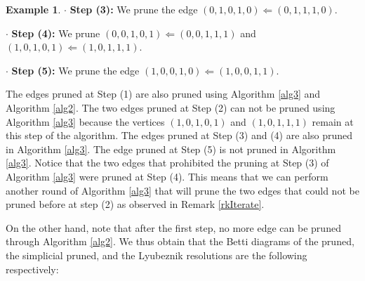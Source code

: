 \documentclass[12pt]{amsart}
\theoremstyle{definition}
\newtheorem{example}[theorem]{Example}
\theoremstyle{remark}
\numberwithin{equation}{section}
\begin{document}
\begin{example}
\noindent $\cdot$ {\bf Step (3):} We prune the edge $(0,1,0,1,0) \Leftarrow (0,1,1,1,0)$.



\noindent $\cdot$ {\bf Step (4):}  We prune  $(0,0,1,0,1) \Leftarrow (0,0,1,1,1)$ and $(1,0,1,0,1) \Leftarrow (1,0,1,1,1)$.

\noindent $\cdot$ {\bf Step (5):} We prune the edge $(1,0,0,1,0) \Leftarrow (1,0,0,1,1)$.

\vskip 2mm



The edges pruned at Step (1) are also pruned using Algorithm \ref{alg3} and Algorithm \ref{alg2}.
The two edges pruned at Step (2) can not be pruned  using Algorithm \ref{alg3} because the vertices
$(1,0,1,0,1)$ and $(1,0,1,1,1)$ remain at this step of the algorithm. The edges pruned at Step (3)
and (4) are also pruned in Algorithm \ref{alg3}. The edge pruned at Step (5) is not pruned in Algorithm \ref{alg3}.
Notice that the two edges that prohibited the pruning at Step (3) of Algorithm \ref{alg3} were pruned at Step (4).
This means that we can perform another round of Algorithm \ref{alg3} that will prune the two edges that could not be pruned
before at step (2) as observed in Remark \ref{rkIterate}.

\vskip 2mm

On the other hand, note that after the first step, no more edge can be pruned through Algorithm \ref{alg2}.
We thus obtain that the Betti diagrams of the pruned, the simplicial pruned, and the Lyubeznik resolutions are
the following respectively:

\vskip 2mm


\end{example}
\end{document}
